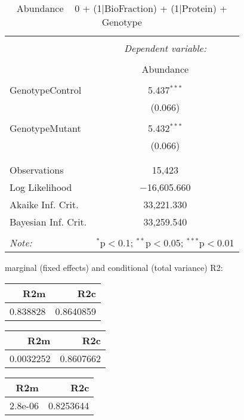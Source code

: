 \documentclass[11pt]{report}
\begin{document}
\begin{table}[!htbp] \centering 
  \caption{Abundance ~ 0 + (1|BioFraction) + (1|Protein) + Genotype} 
  \label{} 
\begin{tabular}{@{\extracolsep{5pt}}lc} 
\\[-1.8ex]\hline 
\hline \\[-1.8ex] 
 & \multicolumn{1}{c}{\textit{Dependent variable:}} \\ 
\cline{2-2} 
\\[-1.8ex] & Abundance \\ 
\hline \\[-1.8ex] 
 GenotypeControl & 5.437$^{***}$ \\ 
  & (0.066) \\ 
  & \\ 
 GenotypeMutant & 5.432$^{***}$ \\ 
  & (0.066) \\ 
  & \\ 
\hline \\[-1.8ex] 
Observations & 15,423 \\ 
Log Likelihood & $-$16,605.660 \\ 
Akaike Inf. Crit. & 33,221.330 \\ 
Bayesian Inf. Crit. & 33,259.540 \\ 
\hline 
\hline \\[-1.8ex] 
\textit{Note:}  & \multicolumn{1}{r}{$^{*}$p$<$0.1; $^{**}$p$<$0.05; $^{***}$p$<$0.01} \\ 
\end{tabular} 
\end{table} 
marginal (fixed effects) and conditional (total variance) R2:

\begin{tabular}{r|r}
\hline
R2m & R2c\\
\hline
0.838828 & 0.8640859\\
\hline
\end{tabular}

\begin{tabular}{r|r}
\hline
R2m & R2c\\
\hline
0.0032252 & 0.8607662\\
\hline
\end{tabular}

\begin{tabular}{r|r}
\hline
R2m & R2c\\
\hline
2.8e-06 & 0.8253644\\
\hline
\end{tabular}
\end{document}
